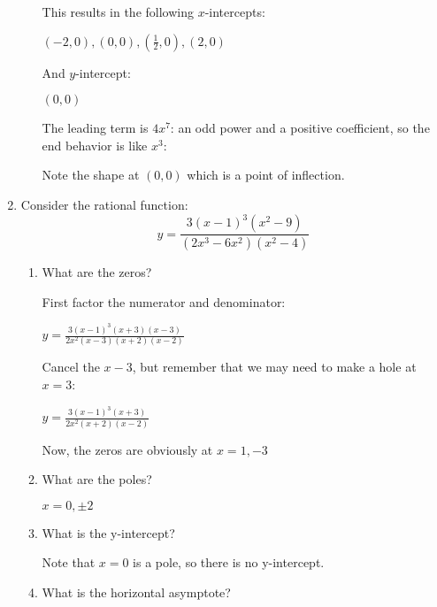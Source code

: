 \documentclass[letterpaper,12pt,fleqn]{article}
\begin{document}
\begin{enumerate}
\begin{enumerate}
    This results in the following $x$-intercepts:

    $(-2,0),(0,0),(\frac{1}{2},0),(2,0)$

    And $y$-intercept:

    $(0,0)$

    The leading term is $4x^7$: an odd power and a positive coefficient, so the
    end behavior is like $x^3$:


    Note the shape at $(0,0)$ which is a point of inflection.

  \end{enumerate}

\item Consider the rational function:
  \[y=\frac{3(x-1)^3(x^2-9)}{(2x^3-6x^2)(x^2-4)}\]
  \begin{enumerate}
  \item What are the zeros?

    First factor the numerator and denominator:

    $y=\frac{3(x-1)^3(x+3)(x-3)}{2x^2(x-3)(x+2)(x-2)}$

    Cancel the $x-3$, but remember that we may need to make a hole at $x=3$:
    
    $y=\frac{3(x-1)^3(x+3)}{2x^2(x+2)(x-2)}$

    Now, the zeros are obviously at $x=1,-3$

  \item What are the poles?

    $x=0,\pm2$
    
  \item What is the y-intercept?

    Note that $x=0$ is a pole, so there is no y-intercept.
    
  \item What is the horizontal asymptote?


\end{enumerate}
\end{enumerate}
\end{document}
